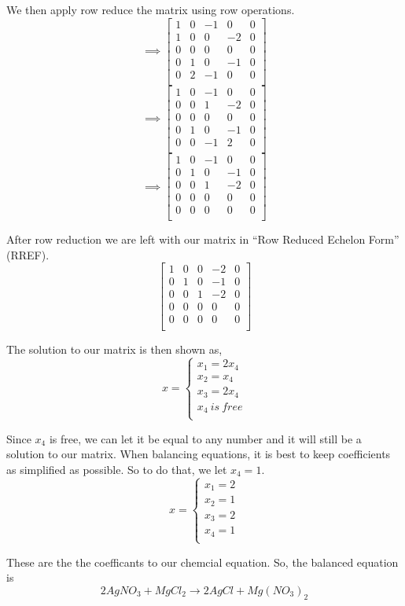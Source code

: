 \documentclass[10pt]{article}
\begin{document}
\begin{multicols}{2}
We then apply row reduce the matrix using row operations.
\[ 
\implies
\left[
\begin{array}{cccc|c}
1 & 0 & -1 & 0 & 0 \\
1 & 0 & 0 & -2 & 0 \\
0 & 0 & 0 & 0 & 0 \\
0 & 1 & 0 & -1 & 0 \\
0 & 2 &-1 & 0 & 0 \\
\end{array}
\right]
\]
\[
\implies
\left[
\begin{array}{cccc|c}
1 & 0 & -1 & 0 & 0 \\
0 & 0 & 1 & -2 & 0 \\
0 & 0 & 0 & 0 & 0 \\
0 & 1 & 0 & -1 & 0 \\
0 & 0 & -1 & 2 & 0 \\
\end{array}
\right]
\]
\[
\implies
\left[ 
\begin{array}{cccc|c}
1 & 0 & -1 & 0 & 0 \\
0 & 1 & 0 & -1 & 0 \\
0 & 0 & 1 & -2 & 0 \\
0 & 0 & 0 & 0 & 0 \\
0 & 0 & 0 & 0 & 0 \\
\end{array}
\right]
\]

After row reduction we are left with our matrix in ``Row Reduced Echelon Form'' (RREF).
\[
\left[
\begin{array}{cccc|c}
1 & 0 & 0 & -2 & 0 \\
0 & 1 & 0 & -1 & 0 \\
0 & 0 & 1 & -2 & 0 \\
0 & 0 & 0 & 0 & 0 \\
0 & 0 & 0 & 0 & 0 \\
\end{array}
\right]
\]

The solution to our matrix is then shown as,
\[
x = 
\left\{
\begin{array}{l}
x_{1} = 2x_{4} \\
x_{2} = x_{4} \\
x_{3} = 2x_{4} \\
x_{4}\ is\ free \\
\end{array}
\right.
\]

Since $x_{4}$ is free, we can let it be equal to any number and it will still be a solution to our matrix. When balancing
equations, it is best to keep coefficients as simplified as possible. So to do that, we let $x_{4} = 1$.
\[
x = 
\left\{
\begin{array}{l}
x_{1} = 2 \\
x_{2} = 1 \\
x_{3} = 2 \\
x_{4} = 1 \\
\end{array}
\right.
\]

These are the the coefficants to our chemcial equation. So, the balanced equation is
\[
2AgNO_{3} + MgCl_{2} \to 2AgCl + Mg(NO_{3})_{2}
\]
\end{multicols}
\end{document}
